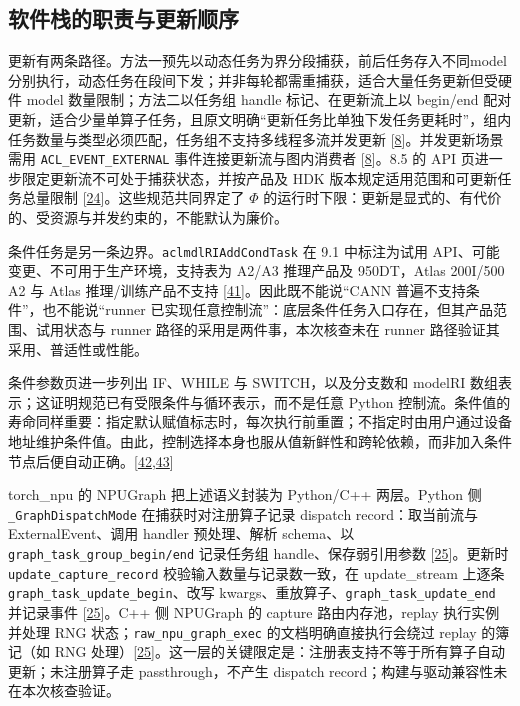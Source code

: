 \documentclass[
  UTF8,
  zihao=5]{ctexart}
\begin{document}
\hypertarget{ux8f6fux4ef6ux6808ux7684ux804cux8d23ux4e0eux66f4ux65b0ux987aux5e8f}{%
\subsection*{软件栈的职责与更新顺序}\label{ux8f6fux4ef6ux6808ux7684ux804cux8d23ux4e0eux66f4ux65b0ux987aux5e8f}}

更新有两条路径。方法一预先以动态任务为界分段捕获，前后任务存入不同model分别执行，动态任务在段间下发；并非每轮都需重捕获，适合大量任务更新但受硬件
model 数量限制；方法二以任务组 handle 标记、在更新流上以 begin/end
配对更新，适合少量单算子任务，且原文明确``更新任务比单独下发任务更耗时''，组内任务数量与类型必须匹配，任务组不支持多线程多流并发更新
{[}\protect\hyperlink{ref-cann910update}{8}{]}。并发更新场景需用
\texttt{ACL\_EVENT\_EXTERNAL} 事件连接更新流与图内消费者
{[}\protect\hyperlink{ref-cann910update}{8}{]}。8.5 的 API
页进一步限定更新流不可处于捕获状态，并按产品及 HDK
版本规定适用范围和可更新任务总量限制
{[}\protect\hyperlink{ref-cann850updateapi}{24}{]}。这些规范共同界定了
\(\Phi\)
的运行时下限：更新是显式的、有代价的、受资源与并发约束的，不能默认为廉价。

条件任务是另一条边界。\texttt{aclmdlRIAddCondTask} 在 9.1 中标注为试用
API、可能变更、不可用于生产环境，支持表为 A2/A3 推理产品及 950DT，Atlas
200I/500 A2 与 Atlas 推理/训练产品不支持
{[}\protect\hyperlink{ref-cann910conditional}{41}{]}。因此既不能说``CANN
普遍不支持条件''，也不能说``runner
已实现任意控制流''：底层条件任务入口存在，但其产品范围、试用状态与
runner 路径的采用是两件事，本次核查未在 runner
路径验证其采用、普适性或性能。

条件参数页进一步列出 IF、WHILE 与 SWITCH，以及分支数和 modelRI
数组表示；这证明规范已有受限条件与循环表示，而不是任意 Python
控制流。条件值的寿命同样重要：指定默认赋值标志时，每次执行前重置；不指定时由用户通过设备地址维护条件值。由此，控制选择本身也服从值新鲜性和跨轮依赖，而非加入条件节点后便自动正确。{[}\protect\hyperlink{ref-audit_cann_cond_params}{42},\protect\hyperlink{ref-audit_cann_cond_create}{43}{]}

torch\_npu 的 NPUGraph 把上述语义封装为 Python/C++ 两层。Python 侧
\texttt{\_GraphDispatchMode} 在捕获时对注册算子记录 dispatch
record：取当前流与 ExternalEvent、调用 handler 预处理、解析 schema、以
\texttt{graph\_task\_group\_begin/end} 记录任务组 handle、保存弱引用参数
{[}\protect\hyperlink{ref-torchnpu2026graphs}{25}{]}。更新时
\texttt{update\_capture\_record} 校验输入数量与记录数一致，在
update\_stream 上逐条 \texttt{graph\_task\_update\_begin}、改写
kwargs、重放算子、\texttt{graph\_task\_update\_end} 并记录事件
{[}\protect\hyperlink{ref-torchnpu2026graphs}{25}{]}。C++ 侧 NPUGraph 的
capture 路由内存池，replay 执行实例并处理 RNG
状态；\texttt{raw\_npu\_graph\_exec} 的文档明确直接执行会绕过 replay
的簿记（如 RNG
处理）{[}\protect\hyperlink{ref-torchnpu2026graphs}{25}{]}。这一层的关键限定是：注册表支持不等于所有算子自动更新；未注册算子走
passthrough，不产生 dispatch record；构建与驱动兼容性未在本次核查验证。
\end{document}
